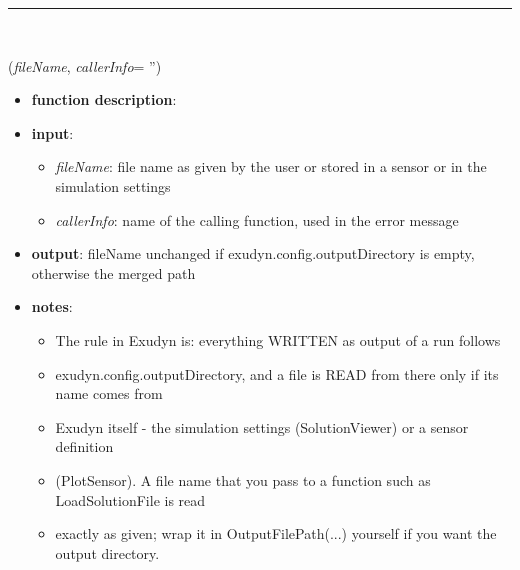 \begin{itemize}[leftmargin=1.4cm]
\begin{itemize}[leftmargin=1.4cm]
\begin{itemize}[leftmargin=1.4cm]
\begin{itemize}[leftmargin=0.5cm]
%
\noindent\rule{8cm}{0.75pt}\vspace{1pt} \\ 
\begin{flushleft}
\label{sec:basicUtilities:OutputFilePath}
({\it fileName}, {\it callerInfo}= '')
\end{flushleft}
\setlength{\itemindent}{0.7cm}
\begin{itemize}[leftmargin=0.7cm]
\item[--]
{\bf function description}: \vspace{-6pt}
\item[--]
{\bf input}: \vspace{-6pt}
\begin{itemize}[leftmargin=1.2cm]
\setlength{\itemindent}{-0.7cm}
\item[]{\it fileName}: file name as given by the user or stored in a sensor or in the simulation settings
\item[]{\it callerInfo}: name of the calling function, used in the error message
\end{itemize}
\item[--]
{\bf output}: fileName unchanged if exudyn.config.outputDirectory is empty, otherwise the merged path
\item[--]
{\bf notes}: \vspace{-6pt}
\begin{itemize}[leftmargin=1.2cm]
\setlength{\itemindent}{-0.7cm}
\item[]The rule in Exudyn is: everything WRITTEN as output of a run follows
\item[]exudyn.config.outputDirectory, and a file is READ from there only if its name comes from
\item[]Exudyn itself - the simulation settings (SolutionViewer) or a sensor definition
\item[](PlotSensor). A file name that you pass to a function such as LoadSolutionFile is read
\item[]exactly as given; wrap it in OutputFilePath(...) yourself if you want the output directory.

\end{itemize}
\end{itemize}
\end{itemize}
\end{itemize}
\end{itemize}
\end{itemize}
